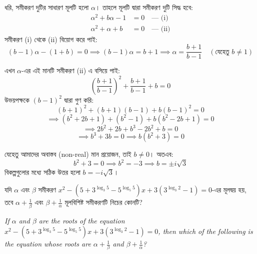 \documentclass[12pt, a4paper]{article}
\begin{document}
\begin{tcolorbox}[solutionbox={সমাধান (Solution)}]
    \noindent
    ধরি, সমীকরণ দুটির সাধারণ মূলটি হলো $\alpha$। 
    তাহলে মূলটি দ্বারা সমীকরণ দুটি সিদ্ধ হবে:
    \begin{align*}
        \alpha^2 + b\alpha - 1 &= 0 \quad \text{--- (i)} \\
        \alpha^2 + \alpha + b &= 0 \quad \text{--- (ii)}
    \end{align*}
    সমীকরণ (i) থেকে (ii) বিয়োগ করে পাই:
    \[ (b-1)\alpha - (1+b) = 0 \implies (b-1)\alpha = b+1 \implies \alpha = \frac{b+1}{b-1} \quad (\text{যেহেতু } b \ne 1) \]
    
    \vspace{0.5em}
    এখন $\alpha$-এর এই মানটি সমীকরণ (ii) এ বসিয়ে পাই:
    \[ \left(\frac{b+1}{b-1}\right)^2 + \frac{b+1}{b-1} + b = 0 \]
    উভয়পক্ষকে $(b-1)^2$ দ্বারা গুণ করি:
    \[ (b+1)^2 + (b+1)(b-1) + b(b-1)^2 = 0 \]
    \[ \implies (b^2 + 2b + 1) + (b^2 - 1) + b(b^2 - 2b + 1) = 0 \]
    \[ \implies 2b^2 + 2b + b^3 - 2b^2 + b = 0 \]
    \[ \implies b^3 + 3b = 0 \implies b(b^2 + 3) = 0 \]
    
    \vspace{0.5em}
    যেহেতু আমাদের অবাস্তব (non-real) মান প্রয়োজন, তাই $b \ne 0$। 
    অতএব:
    \[ b^2 + 3 = 0 \implies b^2 = -3 \implies b = \pm i\sqrt{3} \]
    বিকল্পগুলোর মধ্যে সঠিক উত্তর হলো $b = -i\sqrt{3}$।
\end{tcolorbox}
\begin{tcolorbox}[questionbox={প্রশ্ন (Question) 38}]
    \noindent
    যদি $\alpha$ এবং $\beta$ সমীকরণ $x^2 - (5 + 3^{\log_3 5} - 5^{\log_5 5})x + 3(3^{\log_3 2} - 1) = 0$-এর মূলদ্বয় হয়, তবে $\alpha + \frac{1}{\beta}$ এবং $\beta + \frac{1}{\alpha}$ মূলবিশিষ্ট সমীকরণটি নিচের কোনটি?
    
    \vspace{0.8em}
    \begin{english}
    \noindent\textit{\color{darkgray}
    If $\alpha$ and $\beta$ are the roots of the equation $x^2 - (5 + 3^{\log_3 5} - 5^{\log_5 5})x + 3(3^{\log_3 2} - 1) = 0$, then which of the following is the equation whose roots are $\alpha + \frac{1}{\beta}$ and $\beta + \frac{1}{\alpha}$?
    }
    \end{english}
\end{tcolorbox}
\end{document}
